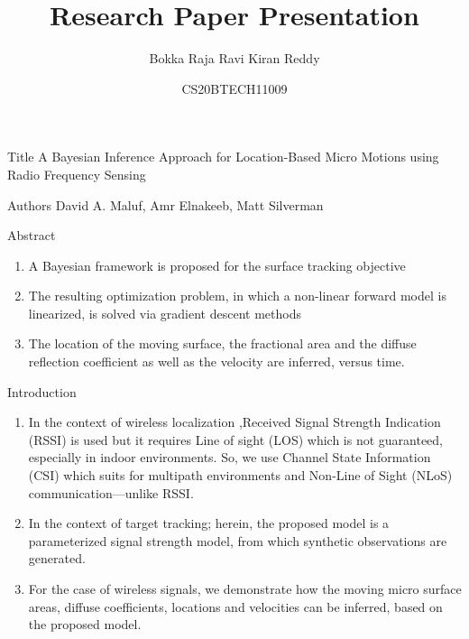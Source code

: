 \documentclass{beamer}
\title{Research Paper Presentation}
\author{Bokka Raja Ravi Kiran Reddy}
\date{CS20BTECH11009}
\begin{document}
%
\begin{frame}
\titlepage
\end{frame}
\begin{frame}
    \begin{block}{Title}
    A Bayesian Inference Approach for Location-Based Micro Motions using Radio Frequency Sensing
    \end{block}
    \begin{block}{Authors}
       David A. Maluf, Amr Elnakeeb, Matt Silverman
    \end{block}
    
\end{frame}
\begin{frame}
\begin{block}{Abstract}
\begin{enumerate}
    \item A Bayesian framework is proposed for the surface tracking objective\label{point-1}
    \item The resulting optimization problem, in which a non-linear forward model is linearized, is solved via gradient descent methods \label{point-2}
    \item  The location of the moving surface, the fractional area and the diffuse reflection coefficient as well as the velocity are inferred, versus time.\label{point-3}
    
\end{enumerate}
\end{block}
\end{frame}
\begin{frame}{Introduction}
\begin{enumerate}
    \item In the context of wireless localization ,Received Signal Strength Indication (RSSI) is used but it requires Line of sight (LOS) which is not guaranteed, especially in indoor environments. So, we use  Channel State Information (CSI) which suits for multipath environments and Non-Line of Sight (NLoS) communication—unlike RSSI.
    \item In the context of target tracking; herein, the proposed model is a parameterized signal strength model, from which synthetic observations are generated.
    \item For the case of wireless signals, we demonstrate how the moving micro surface areas, diffuse coefficients, locations and velocities can be inferred, based on the proposed model.
\end{enumerate}
\end{frame}
\end{document}
